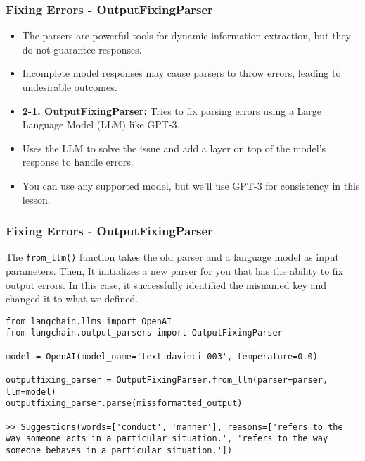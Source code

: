 \begin{frame}[fragile]
\frametitle{Fixing Errors - OutputFixingParser}

\begin{itemize}
    \item The parsers are powerful tools for dynamic information extraction, but they do not guarantee responses.
    \item Incomplete model responses may cause parsers to throw errors, leading to undesirable outcomes.
    \item \textbf{2-1. OutputFixingParser:} Tries to fix parsing errors using a Large Language Model (LLM) like GPT-3.
    \item Uses the LLM to solve the issue and add a layer on top of the model's response to handle errors.
    \item You can use any supported model, but we'll use GPT-3 for consistency in this lesson.
\end{itemize}

\end{frame}


\begin{frame}[fragile]
\frametitle{Fixing Errors - OutputFixingParser}

The \lstinline|from_llm()| function takes the old parser and a language model as input parameters. Then, It initializes a new parser for you that has the ability to fix output errors. In this case, it successfully identified the misnamed key and changed it to what we defined.

\begin{lstlisting}
from langchain.llms import OpenAI
from langchain.output_parsers import OutputFixingParser

model = OpenAI(model_name='text-davinci-003', temperature=0.0)

outputfixing_parser = OutputFixingParser.from_llm(parser=parser, llm=model)
outputfixing_parser.parse(missformatted_output)

>> Suggestions(words=['conduct', 'manner'], reasons=['refers to the way someone acts in a particular situation.', 'refers to the way someone behaves in a particular situation.'])
\end{lstlisting}

\end{frame}

